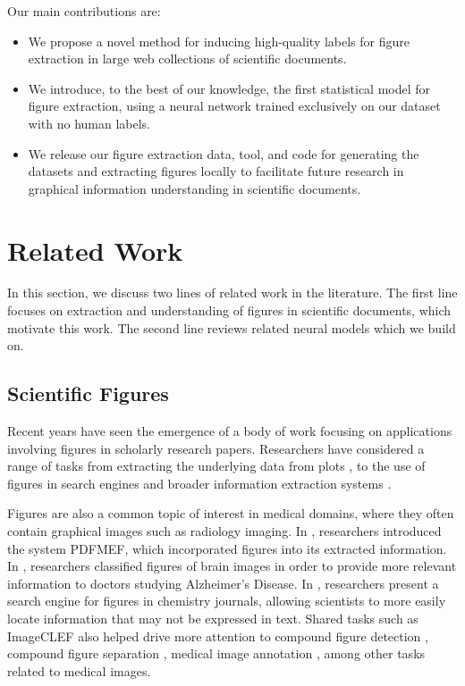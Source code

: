 \documentclass[sigconf]{acmart}
\begin{document}
Our main contributions are:
\begin{itemize}
\item We propose a novel method for inducing high-quality labels for figure extraction in large web collections of scientific documents.
\item We introduce, to the best of our knowledge, the first statistical model for figure extraction, using a neural network trained exclusively on our dataset with no human labels.
\item We release our figure extraction data, tool, and code for generating the datasets and extracting figures locally to facilitate future research in graphical information understanding in scientific documents.
\end{itemize}
\section{Related Work}\label{related_work}
In this section, we discuss two lines of related work in the literature. 
The first line focuses on extraction and understanding of figures in scientific documents, which motivate this work.
The second line reviews related neural models which we build on.
\subsection{Scientific Figures}

Recent years have seen the emergence of a body of work focusing on applications involving  figures in scholarly research papers. 
Researchers have considered a range of tasks from extracting the underlying data from plots \cite{choudhury2015line,figureseer}, to the use of figures in search engines and broader information extraction systems \cite{Choudhury2013AFS,Tsutsui2016AnalyzingFO,Wu2015PDFMEFAM}. 


Figures are also a common topic of interest in medical domains, where they often contain graphical images such as radiology imaging. In \cite{Wu2015PDFMEFAM}, researchers introduced the system PDFMEF, which incorporated figures into its extracted information. In \cite{Tsutsui2016AnalyzingFO}, researchers classified figures of brain images in order to provide more relevant information to doctors studying Alzheimer's Disease. In \cite{Choudhury2013AFS}, researchers present a search engine for figures in chemistry journals, allowing scientists to more easily locate information that may not be expressed in text.
Shared tasks such as ImageCLEF \cite{Herrera2015OverviewOT,Herrera2016OverviewOT} also helped drive more attention to compound figure detection \cite{Yu2017AssemblingDN}, compound figure separation \cite{Tsutsui2017ADD}, medical image annotation \cite{kumar2016adapting}, among other tasks related to medical images.
\end{document}

